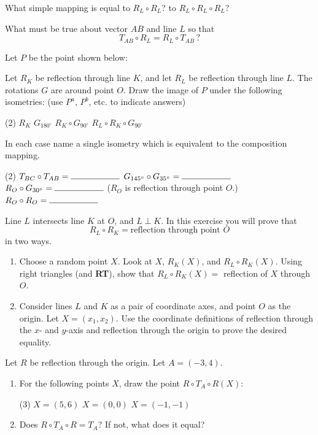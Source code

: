 \documentclass[12pt]{book} %
\begin{document}
\begin{ExerciseList}
\begin{ExerciseList}
\Exercise What simple mapping is equal to $R_L\circ R_L$? to $R_L\circ R_L\circ R_L$?

\Exercise What must be true about vector $AB$ and line $L$ so that
\[
T_{AB}\circ R_L=R_L\circ T_{AB}\, ?
\]

\Exercise Let $P$ be the point shown below:


Let $R_K$ be reflection through line $K$, and let $R_L$ be reflection through line $L$. The rotations $G$ are around point $O$. Draw the image of $P$ under the following isometries: (use $P^a$, $P^b$, etc. to indicate answers)
\begin{tasks}(2)
\task[(a)] $R_K$
\task[(b)] $G_{180^\circ}$
\task[(c)] $R_K\circ G_{90^\circ}$
\task[(d)] $R_L\circ R_K\circ G_{90^\circ}$
\end{tasks}

\Exercise In each case name a single isometry which is equivalent to the composition mapping.
\begin{tasks}(2)
\task[(a)] $T_{BC}\circ T_{AB}=\rule{2cm}{0.4pt}$
\task[(b)] $G_{145^\circ}\circ G_{35^\circ}=\rule{2cm}{0.4pt}$
\task[(c)] $R_O\circ G_{30^\circ}=\rule{2cm}{0.4pt}$ \quad ($R_O$ is reflection through point $O$.)
\task[(d)] $R_O\circ R_O=\rule{2cm}{0.4pt}$
\end{tasks}

\Exercise Line $L$ intersects line $K$ at $O$, and $L\perp K$. In this exercise you will prove that
\[
R_L\circ R_K=\text{reflection through point }O
\]
in two ways.
\begin{enumerate}
\item[(a)] Choose a random point $X$. Look at $X$, $R_K(X)$, and $R_L\circ R_K(X)$. Using right triangles (and \textbf{RT}), show that $R_L\circ R_K(X)=$ reflection of $X$ through $O$.
\item[(b)] Consider lines $L$ and $K$ as a pair of coordinate axes, and point $O$ as the origin. Let $X=(x_1,x_2)$. Use the coordinate definitions of reflection through the $x$- and $y$-axis and reflection through the origin to prove the desired equality.
\end{enumerate}


\Exercise Let $R$ be reflection through the origin. Let $A=(-3,4)$.
\begin{enumerate}
\item[(a)] For the following points $X$, draw the point $R\circ T_A\circ R(X)$:
\begin{tasks}(3)
\task[(i)] $X=(5,6)$
\task[(ii)] $X=(0,0)$
\task[(iii)] $X=(-1,-1)$
\end{tasks}
\item[(b)] Does $R\circ T_A\circ R=T_A$? If not, what does it equal?
\end{enumerate}


\end{ExerciseList}
\end{ExerciseList}
\end{document}
